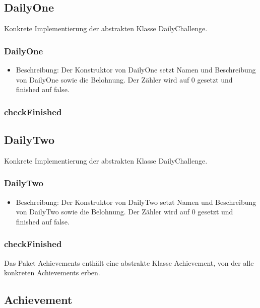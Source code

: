 \documentclass[a4paper]{scrreprt}
\begin{document}
   \subsection{DailyOne}
   Konkrete Implementierung der abstrakten Klasse DailyChallenge.
   \subsubsection{DailyOne}
   \begin{itemize}
   	\item Beschreibung: Der Konstruktor von DailyOne setzt Namen und Beschreibung von DailyOne sowie die Belohnung. Der Zähler wird auf 0 gesetzt und finished auf false.
   \end{itemize}
   \subsubsection{checkFinished}
   
   \subsection{DailyTwo}
   Konkrete Implementierung der abstrakten Klasse DailyChallenge.
   \subsubsection{DailyTwo}
   \begin{itemize}
   	\item Beschreibung: Der Konstruktor von DailyTwo setzt Namen und Beschreibung von DailyTwo sowie die Belohnung. Der Zähler wird auf 0 gesetzt und finished auf false.
   \end{itemize}
   \subsubsection{checkFinished}
   
   Das Paket Achievements enthält eine abstrakte Klasse Achievement, von der alle konkreten Achievements erben.
   
   \subsection{Achievement}
\end{document}
